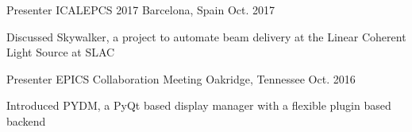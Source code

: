 \begin{cventries}
  \cventry
    {Presenter} 
    {ICALEPCS 2017}
    {Barcelona, Spain}
    {Oct. 2017}
    {
      \begin{cvitems}
        \item {Discussed Skywalker, a project to automate beam delivery at the Linear Coherent Light Source at SLAC}
      \end{cvitems}
    }
  \cventry
    {Presenter} 
    {EPICS Collaboration Meeting}
    {Oakridge, Tennessee}
    {Oct. 2016}
    {
      \begin{cvitems}
        \item {Introduced PYDM, a PyQt based display manager with a flexible plugin based backend}
      \end{cvitems}
    }
\end{cventries}
